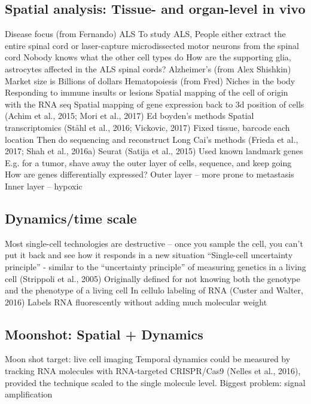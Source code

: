 \subsection{Spatial analysis: Tissue- and organ-level in vivo}

Disease focus (from Fernando)
ALS
To study ALS, People either extract the entire spinal cord or laser-capture microdissected motor neurons from the spinal cord
Nobody knows what the other cell types do 
How are the supporting glia, astrocytes affected in the ALS spinal cords?
Alzheimer's (from Alex Shishkin)
Market size is Billions of dollars
Hematopoiesis (from Fred)
Niches in the body
Responding to immune insults or lesions
Spatial mapping of the cell of origin with the RNA seq
Spatial mapping of gene expression back to 3d position of cells (Achim et al., 2015; Mori et al., 2017)
Ed boyden's methods
Spatial transcriptomics (Ståhl et al., 2016; Vickovic, 2017) 
Fixed tissue, barcode each location
Then do sequencing and reconstruct
Long Cai's methods (Frieda et al., 2017; Shah et al., 2016a)
Seurat (Satija et al., 2015)
Used known landmark genes
E.g. for a tumor, shave away the outer layer of cells, sequence, and keep going
How are genes differentially expressed?
Outer layer -- more prone to metastasis
Inner layer -- hypoxic

\subsection{Dynamics/time scale}

Most single-cell technologies are destructive -- once you sample the cell, you can't put it back and see how it responds in a new situation
``Single-cell uncertainty principle'' - similar to the ``uncertainty principle'' of measuring genetics in a living cell (Strippoli et al., 2005)
Originally defined for not knowing both the genotype and the phenotype of a living cell
In cellulo labeling of RNA (Custer and Walter, 2016)
Labels RNA fluorescently without adding much molecular weight


\subsection{Moonshot: Spatial + Dynamics}

Moon shot target: live cell imaging
Temporal dynamics could be measured by tracking RNA molecules with RNA-targeted CRISPR/Cas9 (Nelles et al., 2016), provided the technique scaled to the single molecule level.
Biggest problem: signal amplification

